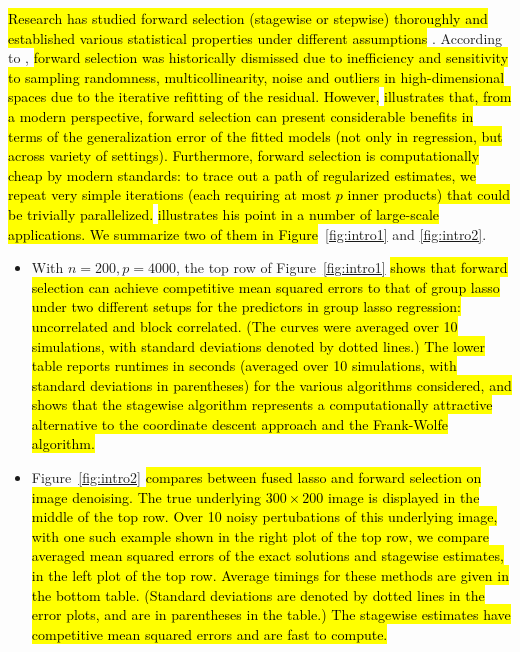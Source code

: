 \documentclass[11pt,review,authoryear]{elsarticle}
\begin{document}
\hl{Research has studied forward selection (stagewise or stepwise) thoroughly and established various statistical properties under different assumptions} \citep{efroymson1966stepwise, draper1966applied, friedman2001elements}. According to \citet{friedman2001elements, weisberg04}, \hl{forward selection was historically dismissed due to inefficiency and sensitivity to sampling randomness, multicollinearity, noise and outliers in high-dimensional spaces due to the iterative refitting of the residual. However,} \citet{tibshirani2015general} \hl{illustrates that, from a modern perspective, forward selection can present considerable benefits in terms of the generalization error of the fitted models (not only in regression, but across variety of settings). Furthermore, forward selection is computationally cheap by modern standards: to trace out a path of regularized estimates, we repeat very simple iterations (each requiring at most $p$ inner products) that could be trivially parallelized.} \citet{tibshirani2015general} \hl{illustrates his point in a number of large-scale applications. We summarize two of them in Figure}~\ref{fig:intro1} and \ref{fig:intro2}.
%
\begin{itemize}
  \item With $n = 200, p = 4000$, the top row of Figure~\ref{fig:intro1} \hl{shows that forward selection can achieve competitive mean squared errors to that of group lasso under two different setups for the predictors in group lasso regression: uncorrelated and block correlated. (The curves were averaged over 10 simulations, with standard deviations denoted by dotted lines.) The lower table reports runtimes in seconds (averaged over 10 simulations, with standard deviations in parentheses) for the various algorithms considered, and shows that the stagewise algorithm represents a computationally attractive alternative to the coordinate descent approach and the Frank-Wolfe algorithm.}
  \item Figure~\ref{fig:intro2} \hl{compares between fused lasso and forward selection on image denoising. The true underlying $300 \times 200$ image is displayed in the middle of the top row. Over 10 noisy pertubations of this underlying image, with one such example shown in the right plot of the top row, we compare averaged mean squared errors of the exact solutions and stagewise estimates, in the left plot of the top row. Average timings for these methods are given in the bottom table. (Standard deviations are denoted by dotted lines in the error plots, and are in parentheses in the table.) The stagewise estimates have competitive mean squared errors and are fast to compute.}
\end{itemize}
\end{document}
